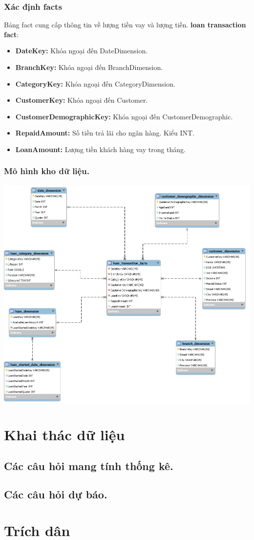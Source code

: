 \documentclass{article}
\begin{document}
\subsubsection{Xác định facts}
    Bảng fact cung cấp thông tin về lượng tiền vay và lượng tiền. 
    \textbf{loan transaction fact}:
    \begin{itemize}
        \item \textbf{DateKey:} Khóa ngoại đến DateDimension.
        \item \textbf{BranchKey:} Khóa ngoại đến BranchDimension.
        \item \textbf{CategoryKey:} Khóa ngoại đến CategoryDimension.
        \item \textbf{CustomerKey:} Khóa ngoại đến Customer.
        \item \textbf{CustomerDemographicKey:} Khóa ngoại đến CustomerDemographic.
        \item \textbf{RepaidAmount:} Số tiền trả lãi cho ngân hàng. Kiểu INT.
        \item \textbf{LoanAmount:} Lượng tiền khách hàng vay trong tháng.

    \end{itemize}
    
\subsubsection{Mô hình kho dữ liệu.}
\begin{center}
    \includegraphics[scale=0.4]{DatawarehouseSchema.png}
\end{center}
\newpage
\section{Khai thác dữ liệu}
\subsection{Các câu hỏi mang tính thống kê.}
\subsection{Các câu hỏi dự báo.}

\section{Trích dân}
\end{document}
